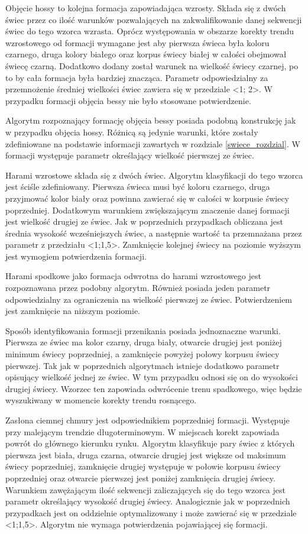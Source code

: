 \documentclass[pdflatex,11pt]{aghdpl}
\begin{document}
Objęcie hossy to kolejna formacja zapowiadająca wzrosty. Składa się z dwóch świec przez co ilość warunków pozwalających na zakwalifikowanie danej sekwencji świec do tego wzorca wzrasta. Oprócz występowania w obszarze korekty trendu wzrostowego od formacji wymagane jest aby pierwsza świeca była koloru czarnego, druga kolory białego oraz korpus świecy białej w całości obejmował świecę czarną. Dodatkowo dodany został warunek na wielkość świecy czarnej, po to by cała formacja była bardziej znacząca. Parametr odpowiedzialny za przemnożenie średniej wielkości świec  zawiera się w przedziale <1; 2>. W przypadku formacji objęcia bessy nie było stosowane potwierdzenie.

Algorytm rozpoznający formację objęcia bessy posiada podobną konstrukcję jak w przypadku objęcia hossy. Różnicą są jedynie warunki, które zostały zdefiniowane na podstawie informacji zawartych w rozdziale \ref{swiece_rozdzial}. W formacji występuje parametr określający wielkość pierwszej ze świec.

Harami wzrostowe składa się z dwóch świec. Algorytm klasyfikacji do tego wzorca jest ściśle zdefiniowany. Pierwsza świeca musi być koloru czarnego, druga przyjmować kolor biały oraz powinna zawierać się w całości w korpusie świecy poprzedniej. Dodatkowym warunkiem zwiększającym znaczenie danej formacji jest wielkość drugiej ze świec. Jak w poprzednich przypadkach obliczana jest średnia wysokość wcześniejszych świec, a następnie wartość ta przemnażana przez parametr z przedziału <1;1,5>. Zamknięcie kolejnej świecy na poziomie wyższym jest wymogiem potwierdzenia formacji.

Harami spodkowe jako formacja odwrotna do harami wzrostowego jest rozpoznawana przez podobny algorytm. Również posiada jeden parametr odpowiedzialny za ograniczenia na wielkość pierwszej ze świec. Potwierdzeniem jest zamknięcie na niższym poziomie.

Sposób identyfikowania formacji przenikania posiada jednoznaczne warunki. Pierwsza ze świec ma kolor czarny, druga biały, otwarcie drugiej jest poniżej minimum świecy poprzedniej, a zamknięcie powyżej połowy korpusu świecy pierwszej. Tak jak w poprzednich algorytmach istnieje dodatkowo parametr opisujący wielkość jednej ze świec. W tym przypadku odnosi się on do wysokości drugiej świecy. Wzorzec ten zapowiada odwrócenie trenu spadkowego, więc będzie wyszukiwany w momencie korekty trendu rosnącego.

Zasłona ciemnej chmury jest odpowiednikiem poprzedniej formacji. Występuje przy malejącym trendzie długoterminowym. W miejscach korekt zapowiada powrót do głównego kierunku rynku. Algorytm klasyfikuje pary świec z których pierwsza jest biała, druga czarna, otwarcie drugiej jest większe od maksimum świecy poprzedniej, zamknięcie drugiej występuje w połowie korpusu świecy poprzedniej oraz otwarcie pierwszej jest poniżej zamknięcia drugiej świecy. Warunkiem zawężającym ilość sekwencji zaliczających się do tego wzorca jest parametr określający wysokość drugiej świecy. Analogicznie jak w poprzednich przypadkach jest on oddzielnie optymalizowany i może zawierać się w przedziale <1;1,5>. Algorytm nie wymaga potwierdzenia pojawiającej się formacji.
\end{document}
